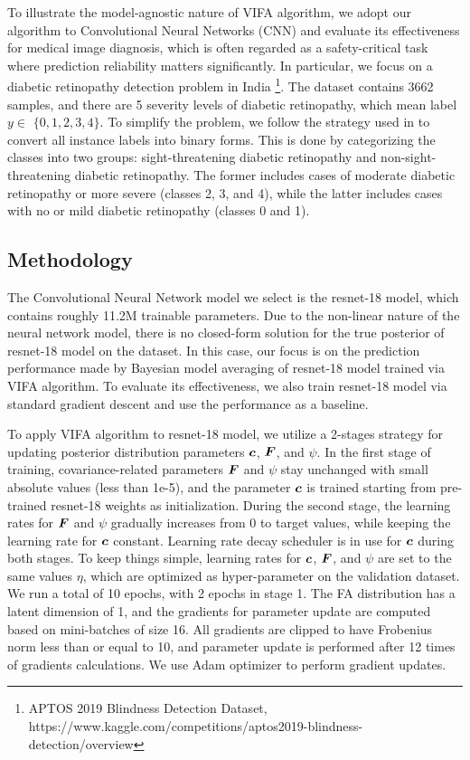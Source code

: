 \documentclass[10pt]{article} %
\begin{document}
To illustrate the model-agnostic nature of VIFA algorithm, we adopt our algorithm to Convolutional Neural Networks (CNN) and evaluate its effectiveness for medical image diagnosis, which is often regarded as a safety-critical task where prediction reliability matters significantly. In particular, we focus on a diabetic retinopathy detection problem in India \footnote{APTOS 2019 Blindness Detection Dataset, https://www.kaggle.com/competitions/aptos2019-blindness-detection/overview}. The dataset contains 3662 samples, and there are 5 severity levels of diabetic retinopathy, which mean label $y \in$ $\{0,1,2,3,4\}$. To simplify the problem, we follow the strategy used in \citet{leibig2017leveraging} to convert all instance labels into binary forms. This is done by categorizing the classes into two groups: sight-threatening diabetic retinopathy and non-sight-threatening diabetic retinopathy. The former includes cases of moderate diabetic retinopathy or more severe (classes 2, 3, and 4), while the latter includes cases with no or mild diabetic retinopathy (classes 0 and 1).

\subsection{Methodology}

The Convolutional Neural Network model we select is the resnet-18 model, which contains roughly 11.2M trainable parameters. Due to the non-linear nature of the neural network model, there is no closed-form solution for the true posterior of resnet-18 model on the dataset. In this case, our focus is on the prediction performance made by Bayesian model averaging of resnet-18 model trained via VIFA algorithm. To evaluate its effectiveness, we also train resnet-18 model via standard gradient descent and use the performance as a baseline. 

To apply VIFA algorithm to resnet-18 model, we utilize a 2-stages strategy for updating posterior distribution parameters ${\bm{c}}$, ${\bm{F}}$, and $\psi$. In the first stage of training, covariance-related parameters ${\bm{F}}$ and $\psi$ stay unchanged with small absolute values (less than 1e-5), and the parameter ${\bm{c}}$ is trained starting from pre-trained resnet-18 weights as initialization. During the second stage, the learning rates for ${\bm{F}}$ and $\psi$ gradually increases from 0 to target values, while keeping the learning rate for ${\bm{c}}$ constant. Learning rate decay scheduler is in use for ${\bm{c}}$ during both stages. To keep things simple, learning rates for ${\bm{c}}$, ${\bm{F}}$, and $\psi$ are set to the same values $\eta$, which are optimized as hyper-parameter on the validation dataset. We run a total of 10 epochs, with 2 epochs in stage 1. The FA distribution has a latent dimension of 1, and the gradients for parameter update are computed based on mini-batches of size 16. All gradients are clipped to have Frobenius norm less than or equal to 10, and parameter update is performed after 12 times of gradients calculations. We use Adam optimizer \citep{kingma2014adam} to perform gradient updates.
\end{document}
